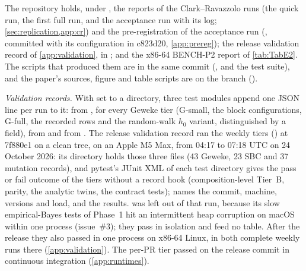 The repository holds, under , the reports of the Clark--Ravazzolo runs
(the quick run, the first full run, and the acceptance run with its log;
\cref{sec:replication,app:cr}) and the pre-registration of the acceptance run
(, committed with its configuration in c823d20,
\cref{app:prereg}); the release validation record of \cref{app:validation}, in
; and the x86-64 BENCH-P2 report of
\cref{tab:TabE2}.
The scripts that produced them are in the same commit (,
 and the test suite), and the paper's sources, figure and table
scripts are on the branch  ().

\emph{Validation records.}
With  set to a directory, three test modules append one JSON line
per run to it:  from , for every Geweke tier (G-small, the
block configurations, G-full, the recorded  rows and the random-walk $h_0$
variant, distinguished by a  field),  from  and
 from .
The release validation record ran the weekly tiers ()
at 7f880e1 on a clean tree, on an Apple M5 Max, from 04:17 to 07:18 UTC on 24 October 2026: its
 directory holds those three files (43 Geweke, 23 SBC and 37 mutation records), and
pytest's JUnit XML of each test directory gives the pass or fail outcome of the tiers without a
record hook (composition-level Tier~B, parity, the analytic twins, the contract tests);
 names the commit, machine, versions and load, and  the results.
 was left out of that run, because its slow empirical-Bayes tests of Phase~1 hit
an intermittent heap corruption on macOS within one process (issue~\#3); they pass in
isolation and feed no table. After the release they also passed in one process on x86-64 Linux, in
both complete weekly runs there (\cref{app:validation}).
The per-PR tier passed on the release commit in continuous integration
(\cref{app:runtimes}).


